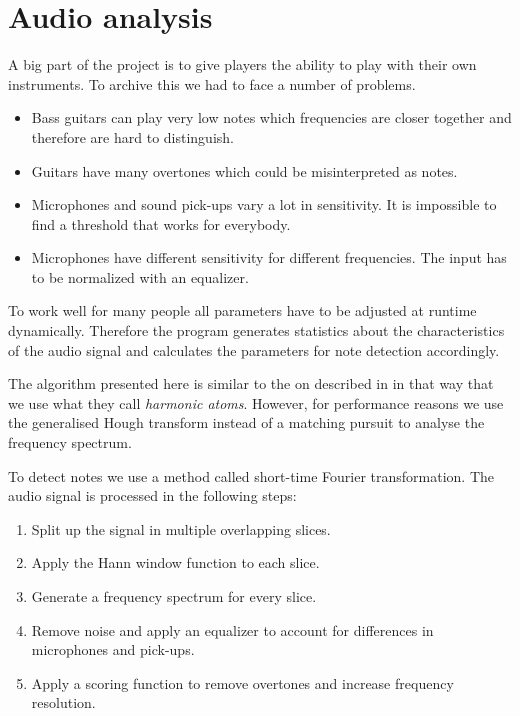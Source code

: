 \chapter[Audio analysis \textsuperscript{Kugler}]{Audio analysis}
\label{chap:Audio analysis}

A big part of the project is to give players the ability to play with their own instruments. To archive this we had to face a number of problems. 
\begin{itemize}
	\item Bass guitars can play very low notes which frequencies are closer together and therefore are hard to distinguish.
	\item Guitars have many overtones which could be misinterpreted as notes. 
	\item Microphones and sound \glspl{pick-up} vary a lot in sensitivity. It is impossible to find a threshold that works for everybody. 
	\item Microphones have different sensitivity for different frequencies. The input has to be normalized with an equalizer. 
\end{itemize}

To work well for many people all parameters have to be adjusted at runtime dynamically. Therefore the program generates statistics about the characteristics of the audio signal and calculates the parameters for note detection accordingly. 


The algorithm presented here is similar to the on described in \cite{harmo1} in that way that we use what they call \emph{harmonic atoms}. However, for performance reasons we use the generalised Hough transform instead of a matching pursuit to analyse the frequency spectrum. 


To detect notes we use a method called short-time Fourier transformation. The audio signal is processed in the following steps:
\begin{enumerate}
	\item Split up the signal in multiple overlapping slices.
	\item Apply the Hann window function to each slice.
	\item Generate a frequency spectrum for every slice.
	\item Remove noise and apply an equalizer to account for differences in microphones and \glspl{pick-up}.
	\item Apply a scoring function to remove overtones and increase frequency resolution.
\end{enumerate}

